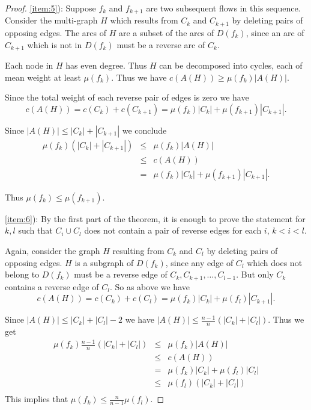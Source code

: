   \begin{proof}
    
    \ref{item:5}): Suppose $f_k$ and $f_{k+1}$ are two subsequent flows in this
    sequence. Consider the multi-graph $H$ which results from $C_k$
    and $C_{k+1}$ by deleting pairs of opposing edges.  The arcs of
    $H$ are a subset of the arcs of $D(f_k)$, since an arc of
    $C_{k+1}$ which is not in $D(f_k)$ must be a reverse arc of $C_k$.

    Each node in $H$ has even degree.  Thus $H$ can be
    decomposed into cycles, each of mean weight at least $ \mu(f_k)$.  
    Thus we have $c(A(H)) \geq \mu(f_k) |A(H)|$. 

    Since the total weight of each reverse pair of edges is zero we
    have 
    \begin{displaymath}
      c(A(H)) = c(C_k) + c(C_{k+1}) = \mu(f_k) |C_k|   + \mu(f_{k+1}) |C_{k+1}|.
    \end{displaymath}

    Since $|A(H)| \leq |C_k| + |C_{k+1}|$ we conclude 
    \begin{eqnarray*}
       \mu(f_k) ( |C_k| + |C_{k+1}|) & \leq &  \mu(f_k)|A(H)| \\
                              & \leq & c(A(H)) \\
                              & = & \mu(f_k) |C_k|   + \mu(f_{k+1}) |C_{k+1}|.
    \end{eqnarray*}

    Thus $\mu(f_k) \leq \mu(f_{k+1})$. 

    
    \ref{item:6}): By the first part of the theorem, it is enough to
    prove the statement for $k,l$ such that $C_i \cup C_l$ does not
    contain a pair of reverse edges for each  $ i, \, k < i < l$.  

    Again, consider the graph $H$ resulting from  $C_k$
    and $C_{l}$ by deleting pairs of opposing edges. $H$ is a subgraph
    of $D(f_k)$, since any edge of $C_l$ which does not belong to
    $D(f_k)$ must be a reverse edge of $C_k,C_{k+1},\ldots,C_{l-1}$. But
    only $C_k$ contains a reverse edge of $C_l$. So as above we have 
    \begin{displaymath}
      c(A(H)) = c(C_k) + c(C_{l}) = \mu(f_k) |C_k|   + \mu(f_{l})      |C_{k+1}|. 
    \end{displaymath}
    
    Since $|A(H)| \leq |C_k| + |C_{l}| -2$ we have $|A(H)| \leq
    \frac{n-1}{n}( |C_k| + |C_{l}|)$. Thus we get
    \begin{eqnarray*}
       \mu(f_k)\frac{n-1}{n} ( |C_k| + |C_{l}|) & \leq &  \mu(f_k)|A(H)| \\
                              & \leq & c(A(H)) \\
                              & = & \mu(f_k) |C_k|   + \mu(f_{l})|C_{l}|\\          
                              & \leq & \mu(f_{l}) (|C_k|   + |C_{l}|) \\                       
    \end{eqnarray*}
    This implies that $\mu(f_k) \leq \frac{n}{n-1}  \mu(f_l)$.  
    
  \end{proof}
